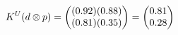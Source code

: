 \documentclass[preview]{standalone}
\begin{document}
\begin{align*}
\special{dvisvgm:raw <g id='unique000'>}K^U(d \otimes p) = \begin{pmatrix} (0.92)(0.88) \\ (0.81)(0.35) \end{pmatrix} = \begin{pmatrix} 0.81 \\ 0.28 \end{pmatrix}\special{dvisvgm:raw </g>}
\end{align*}
\end{document}
